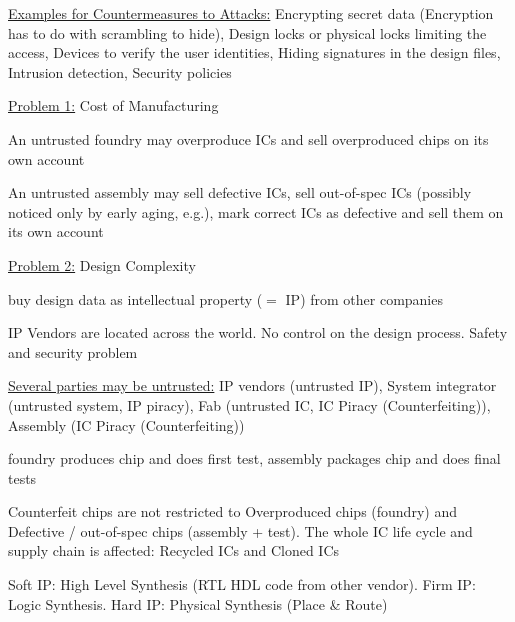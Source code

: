 \documentclass[landscape, a4paper]{article}
\begin{document}
\begin{minipage}[t]{0.2\linewidth}
\begin{betterlist}
		\item \underline{Examples for Countermeasures to Attacks:} Encrypting secret data (Encryption has to do with scrambling to hide), Design locks or physical locks limiting the access, Devices to verify the user identities, Hiding signatures in the design files, Intrusion detection, Security policies
	\end{betterlist}
	\begin{betterlist}
		\item \underline{Problem 1:} Cost of Manufacturing
		\begin{betterlist}
			\item An \alert{untrusted foundry} may overproduce ICs and sell overproduced chips on its own account
			\item An \alert{untrusted assembly} may sell defective ICs, sell out-of-spec ICs (possibly noticed only by early aging, e.g.), mark correct ICs as defective and sell them on its own account
		\end{betterlist}
		\item \underline{Problem 2:} Design Complexity
		\begin{betterlist}
			\item buy design data as \alert{intellectual property} ($=$ \alert{IP}) from other companies
			\item \alert{IP Vendors} are located across the world. No control on the design process. Safety and security problem
		\end{betterlist}
		\item \underline{Several parties may be untrusted:} IP vendors (untrusted IP), System integrator (untrusted system, IP piracy), Fab (untrusted IC, IC Piracy (Counterfeiting)), Assembly (IC Piracy (Counterfeiting))
		\begin{betterlist}
			\item \alert{foundry} produces chip and does first test, \alert{assembly} packages chip and does final tests
		\end{betterlist}
		\item  \alert{Counterfeit} chips are not restricted to Overproduced chips (foundry) and Defective / out-of-spec chips (assembly + test). The whole IC life cycle and supply chain is affected: \alert{Recycled ICs} and \alert{Cloned ICs}
		\item \alert{Soft IP:} High Level Synthesis (RTL HDL code from other vendor). \alert{Firm IP:} Logic Synthesis. \alert{Hard IP:} Physical Synthesis (Place \& Route)

\end{betterlist}
\end{minipage}
\end{document}
